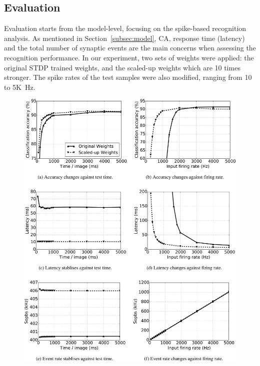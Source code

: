 \subsection{Evaluation}
Evaluation starts from the model-level, focusing on the spike-based recognition analysis.
As mentioned in Section~\ref{subsec:model}, CA, response time (latency) and the total number of synaptic events are the main concerns when assessing the recognition performance.
In our experiment, two sets of weights were applied: the original STDP trained weights, and the scaled-up weights which are 10 times stronger.
The spike rates of the test samples were also modified, ranging from 10 to 5K~Hz.
\begin{figure}[htb!]
	\centering
	\includegraphics[width=1\textwidth]{pics_bench/fig7.jpg}

\end{figure}
